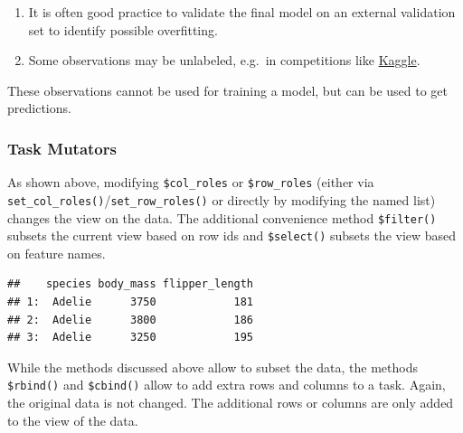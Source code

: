 \documentclass[
]{scrbook}
\newenvironment{Shaded}{\begin{snugshade}}{\end{snugshade}}
\newcommand{\CommentTok}[1]{\textcolor[rgb]{0.56,0.35,0.01}{\textit{#1}}}
\newcommand{\DecValTok}[1]{\textcolor[rgb]{0.00,0.00,0.81}{#1}}
\newcommand{\FunctionTok}[1]{\textcolor[rgb]{0.00,0.00,0.00}{#1}}
\newcommand{\NormalTok}[1]{#1}
\newcommand{\OtherTok}[1]{\textcolor[rgb]{0.56,0.35,0.01}{#1}}
\newcommand{\SpecialCharTok}[1]{\textcolor[rgb]{0.00,0.00,0.00}{#1}}
\newcommand{\StringTok}[1]{\textcolor[rgb]{0.31,0.60,0.02}{#1}}
\providecommand{\tightlist}{%
  \setlength{\itemsep}{0pt}\setlength{\parskip}{0pt}}
\renewenvironment{Shaded} {\begin{snugshade}\small} {\end{snugshade}}
\begin{document}
\begin{enumerate}
\def\labelenumi{\arabic{enumi}.}
\tightlist
\item
  It is often good practice to validate the final model on an external validation set to identify possible overfitting.
\item
  Some observations may be unlabeled, e.g.~in competitions like \href{https://www.kaggle.com/}{Kaggle}.
\end{enumerate}

These observations cannot be used for training a model, but can be used to get predictions.

\hypertarget{tasks-mutators}{%
\subsubsection{Task Mutators}\label{tasks-mutators}}

As shown above, modifying \texttt{\$col\_roles} or \texttt{\$row\_roles} (either via \texttt{set\_col\_roles()}/\texttt{set\_row\_roles()} or directly by modifying the named list) changes the view on the data.
The additional convenience method \texttt{\$filter()} subsets the current view based on row ids and \texttt{\$select()} subsets the view based on feature names.

\begin{Shaded}
\end{Shaded}

\begin{verbatim}
##    species body_mass flipper_length
## 1:  Adelie      3750            181
## 2:  Adelie      3800            186
## 3:  Adelie      3250            195
\end{verbatim}

While the methods discussed above allow to subset the data, the methods \texttt{\$rbind()} and \texttt{\$cbind()} allow to add extra rows and columns to a task.
Again, the original data is not changed.
The additional rows or columns are only added to the view of the data.
\end{document}
